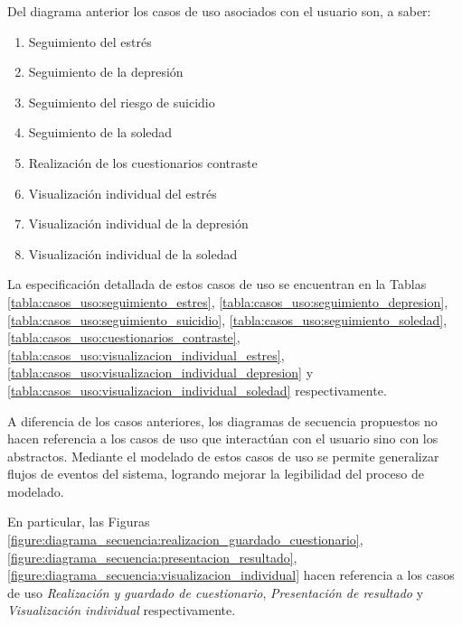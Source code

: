             Del diagrama anterior los casos de uso asociados con el usuario son, a saber:

            \begin{enumerate}[resume=casos-uso,label=\textbf{\texttt{CU-\arabic*}}]
                \item \label{disenio:casos_uso:seguimiento_estres} Seguimiento del estrés
                \item \label{disenio:casos_uso:seguimiento_depresion} Seguimiento de la depresión
                \item \label{disenio:casos_uso:seguimiento_suicidio} Seguimiento del riesgo de suicidio
                \item \label{disenio:casos_uso:seguimiento_soledad} Seguimiento de la soledad
                \item \label{disenio:casos_uso:cuestionarios_contraste} Realización de los cuestionarios contraste
                \item \label{disenio:casos_uso:visualizacion_individual_estres} Visualización individual del estrés
                \item \label{disenio:casos_uso:visualizacion_individual_depresion} Visualización individual de la depresión
                \item \label{disenio:casos_uso:visualizacion_individual_soledad} Visualización individual de la soledad
            \end{enumerate}

            La especificación detallada de estos casos de uso se encuentran en la Tablas \ref{tabla:casos_uso:seguimiento_estres}, \ref{tabla:casos_uso:seguimiento_depresion}, \ref{tabla:casos_uso:seguimiento_suicidio}, \ref{tabla:casos_uso:seguimiento_soledad}, \ref{tabla:casos_uso:cuestionarios_contraste}, \ref{tabla:casos_uso:visualizacion_individual_estres},
            \ref{tabla:casos_uso:visualizacion_individual_depresion} y  \ref{tabla:casos_uso:visualizacion_individual_soledad} respectivamente. 

            A diferencia de los casos anteriores, los diagramas de secuencia propuestos no hacen referencia a los casos de uso que interactúan con el usuario sino con los abstractos. Mediante el modelado de estos casos de uso se permite generalizar flujos de eventos del sistema, logrando mejorar la legibilidad del proceso de modelado.

            En particular, las Figuras \ref{figure:diagrama_secuencia:realizacion_guardado_cuestionario}, \ref{figure:diagrama_secuencia:presentacion_resultado}, \ref{figure:diagrama_secuencia:visualizacion_individual} hacen referencia a los casos de uso \textit{Realización y guardado de cuestionario}, \textit{Presentación de resultado} y \textit{Visualización individual} respectivamente.

